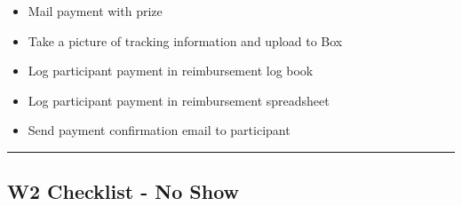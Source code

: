 \documentclass[]{book}
\providecommand{\tightlist}{%
  \setlength{\itemsep}{0pt}\setlength{\parskip}{0pt}}
\begin{document}
\begin{itemize}
\tightlist
\item
  Mail payment with prize
\item
  Take a picture of tracking information and upload to Box
\item
  Log participant payment in reimbursement log book
\item
  Log participant payment in reimbursement spreadsheet
\item
  Send payment confirmation email to participant
\end{itemize}

\begin{center}\rule{0.5\linewidth}{0.5pt}\end{center}

\hypertarget{w2-checklist---no-show}{%
\subsection{W2 Checklist - No Show}\label{w2-checklist---no-show}}
\end{document}
